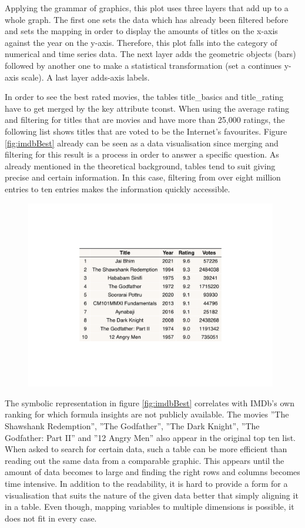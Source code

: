 Applying the grammar of graphics, this plot uses three layers that add up to a whole graph. The first one sets the data which has already been filtered before and sets the mapping in order to display the amounts of titles on the x-axis against the year on the y-axis. Therefore, this plot falls into the category of numerical and time series data. The next layer adds the geometric objects (bars) followed by another one to make a statistical transformation (set a continues y-axis scale). A last layer adds-axis labels.

In order to see the best rated movies, the tables title\_basics and title\_rating have to get merged by the key attribute tconst. When using the average rating and filtering for titles that are movies and have more than 25,000 ratings, the following list shows titles that are voted to be the Internet's favourites. Figure \ref{fig:imdbBest} already can be seen as a data visualisation since merging and filtering for this result is a process in order to answer a specific question. As already mentioned in the theoretical background, tables tend to suit giving precise and certain information. In this case, filtering from over eight million entries to ten entries makes the information quickly accessible.\\ 

\begin{figure}[caption={Movies with the highest average rating that contain more than 25,000 votes}, label={fig:imdbBest}]
	{\includegraphics[width=11cm]{figures/best.pdf}}
\end{figure}

The symbolic representation in figure \ref{fig:imdbBest} correlates with IMDb's own ranking for which formula insights are not publicly available. The movies ''The Shawshank Redemption'', ''The Godfather'', ''The Dark Knight'', ''The Godfather: Part II'' and ''12 Angry Men'' also appear in the original top ten list. When asked to search for certain data, such a table can be more efficient than reading out the same data from a comparable graphic. This appears until the amount of data becomes to large and finding the right rows and columns becomes time intensive. In addition to the readability, it is hard to provide a form for a visualisation that suits the nature of the given data better that simply aligning it in a table. Even though, mapping variables to multiple dimensions is possible, it does not fit in every case.


